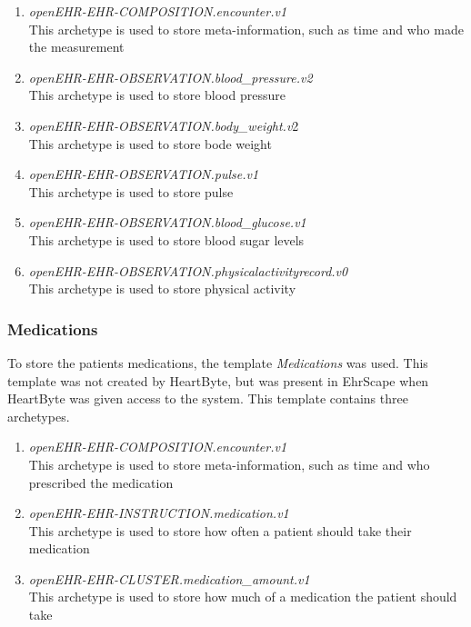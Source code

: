 \documentclass{article}
\begin{document}
\begin{enumerate}[label=(\roman*)]
\item \emph{openEHR-EHR-COMPOSITION.encounter.v1} \\
This archetype is used to store meta-information, such as time and who made the measurement
\item \emph{openEHR-EHR-OBSERVATION.blood\_pressure.v2} \\
This archetype is used to store blood pressure
\item \emph{openEHR-EHR-OBSERVATION.body\_weight.v}2 \\
This archetype is used to store bode weight
\item \emph{openEHR-EHR-OBSERVATION.pulse.v1} \\
This archetype is used to store pulse
\item \emph{openEHR-EHR-OBSERVATION.blood\_glucose.v1} \\
This archetype is used to store blood sugar levels
\item \emph{openEHR-EHR-OBSERVATION.physicalactivityrecord.v0} \\ 
This archetype is used to store physical activity
\end{enumerate}

\subsubsection{Medications}
To store the patients medications, the template \emph{Medications} was used. This template was not created by HeartByte, but was present in EhrScape when HeartByte was given access to the system. This template contains three archetypes. 

\begin{enumerate}[label=(\roman*)]
\item \emph{openEHR-EHR-COMPOSITION.encounter.v1} \\
This archetype is used to store meta-information, such as time and who prescribed the medication
\item \emph{openEHR-EHR-INSTRUCTION.medication.v1} \\
This archetype is used to store how often a patient should take their medication
\item \emph{openEHR-EHR-CLUSTER.medication\_amount.v1} \\
This archetype is used to store how much of a medication the patient should take
\end{enumerate}
\end{document}
